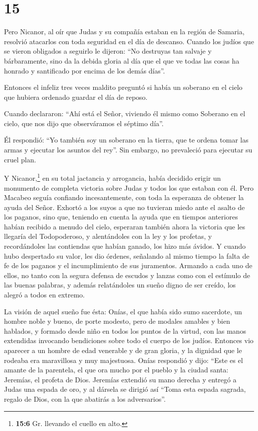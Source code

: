 \hypertarget{section-14}{%
\section{15}\label{section-14}}

 Pero Nicanor, al oír que Judas y su compañía estaban en
la región de Samaria, resolvió atacarlos con toda seguridad en el día de
descanso.  Cuando los judíos que se vieron obligados a
seguirlo le dijeron: ``No destruyas tan salvaje y bárbaramente, sino da
la debida gloria al día que el que ve todas las cosas ha honrado y
santificado por encima de los demás días''.

 Entonces el infeliz tres veces maldito preguntó si había
un soberano en el cielo que hubiera ordenado guardar el día de reposo.

 Cuando declararon: ``Ahí está el Señor, viviendo él mismo
como Soberano en el cielo, que nos dijo que observáramos el séptimo
día''.

 Él respondió: ``Yo también soy un soberano en la tierra,
que te ordena tomar las armas y ejecutar los asuntos del rey''. Sin
embargo, no prevaleció para ejecutar su cruel plan.

 Y Nicanor,\footnote{\textbf{15:6} Gr. llevando el cuello
  en alto.} en su total jactancia y arrogancia, había decidido erigir un
monumento de completa victoria sobre Judas y todos los que estaban con
él.  Pero Macabeo seguía confiando incesantemente, con
toda la esperanza de obtener la ayuda del Señor.  Exhortó
a los suyos a que no tuvieran miedo ante el asalto de los paganos, sino
que, teniendo en cuenta la ayuda que en tiempos anteriores habían
recibido a menudo del cielo, esperaran también ahora la victoria que les
llegaría del Todopoderoso,  y alentándoles con la ley y
los profetas, y recordándoles las contiendas que habían ganado, los hizo
más ávidos.  Y cuando hubo despertado su valor, les dio
órdenes, señalando al mismo tiempo la falta de fe de los paganos y el
incumplimiento de sus juramentos.  Armando a cada uno de
ellos, no tanto con la segura defensa de escudos y lanzas como con el
estímulo de las buenas palabras, y además relatándoles un sueño digno de
ser creído, los alegró a todos en extremo.

 La visión de aquel sueño fue ésta: Onías, el que había
sido sumo sacerdote, un hombre noble y bueno, de porte modesto, pero de
modales amables y bien hablados, y formado desde niño en todos los
puntos de la virtud, con las manos extendidas invocando bendiciones
sobre todo el cuerpo de los judíos.  Entonces vio
aparecer a un hombre de edad venerable y de gran gloria, y la dignidad
que le rodeaba era maravillosa y muy majestuosa.  Onías
respondió y dijo: ``Este es el amante de la parentela, el que ora mucho
por el pueblo y la ciudad santa: Jeremías, el profeta de Dios.
 Jeremías extendió su mano derecha y entregó a Judas una
espada de oro, y al dársela se dirigió así  ``Toma esta
espada sagrada, regalo de Dios, con la que abatirás a los adversarios''.

